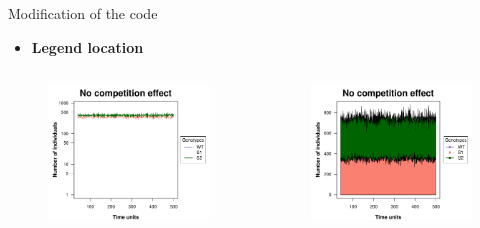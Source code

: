 \begin{frame}{Modification of the code}
	\begin{itemize}
		\item \textbf{Legend location}
	\end{itemize}
	\begin{columns}
		\begin{column}{0.5\textwidth}
			\begin{figure}
				\includegraphics[width=0.95\linewidth]{img/line_example.pdf}
			\end{figure}
		\end{column}
		\begin{column}{0.5\textwidth}
			\begin{figure}
				\includegraphics[width=0.95\linewidth]{img/stream_example.pdf}
			\end{figure}
		\end{column}
	\end{columns}
\end{frame}
